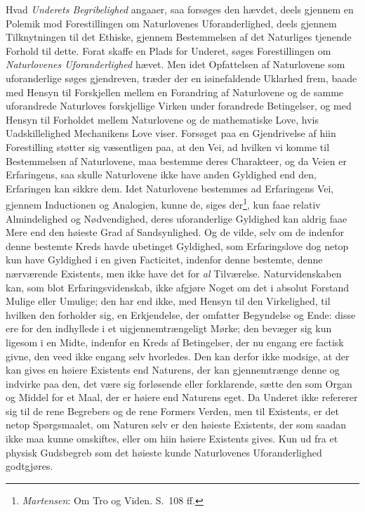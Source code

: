 \documentclass[12pt,a4paper]{book}
\newcommand{\opage}[1]{\marginnote{\footnotesize\textit{[#1]}}}
\begin{document}
Hvad \emph{Underets Begribelighed} angaaer, saa forsøges den hævdet, deels gjennem en Polemik
mod Forestillingen om Naturlovenes Uforanderlighed, deels gjennem Tilknytningen til det
Ethiske, gjennem Bestemmelsen af det Naturliges tjenende Forhold til dette. Forat skaffe
en Plads for Underet, søges Forestillingen om \emph{Naturlovenes Uforanderlighed} hævet. Men
idet Opfattelsen af Naturlovene som uforanderlige søges gjendreven, træder der en
iøinefaldende Uklarhed frem, baade med Hensyn til Forskjellen mellem en Forandring af
Naturlovene og de samme uforandrede Naturloves forskjellige Virken under forandrede
Betingelser, og med Hensyn til Forholdet mellem Naturlovene og de mathematiske Love, hvis
Uadskillelighed Mechanikens Love viser. Forsøget paa en Gjendrivelse af hiin Forestilling
støtter sig væsentligen paa, at den Vei, ad hvilken vi komme til Bestemmelsen af
Naturlovene, maa bestemme deres Charakteer, og da Veien er Erfaringens, saa skulle
Naturlovene ikke have anden Gyldighed end den, Erfaringen kan sikkre dem. Idet
Naturlovene bestemmes ad Erfaringens Vei, gjennem Inductionen og Analogien, kunne de,
siges der\footnote{\emph{Martensen}: Om Tro og Viden. S.\ 108 ff.}, kun faae relativ
Almindelighed og Nødvendighed, deres uforanderlige Gyldighed kan aldrig faae Mere end den
høieste Grad af Sandsynlighed. Og de vilde, selv om de indenfor denne bestemte Kreds
havde ubetinget Gyldighed, som Erfaringslove dog netop kun have Gyldighed i en given
Facticitet, indenfor denne bestemte, denne nærværende Existents, men ikke have det for \emph{al} Tilværelse. \opage{83}Naturvidenskaben kan, som blot Erfaringsvidenskab, ikke afgjøre Noget om det
i absolut Forstand Mulige eller Umulige; den har end ikke, med Hensyn til den
Virkelighed, til hvilken den forholder sig, en Erkjendelse, der omfatter Begyndelse og
Ende: disse ere for den indhyllede i et uigjennemtrængeligt Mørke; den bevæger sig kun
ligesom i en Midte, indenfor en Kreds af Betingelser, der nu engang ere factisk givne,
den veed ikke engang selv hvorledes. Den kan derfor ikke modsige, at der kan gives en
høiere Existents end Naturens, der kan gjennemtrænge denne og indvirke paa den, det være
sig forløsende eller forklarende, sætte den som Organ og Middel for et Maal, der er
høiere end Naturens eget. Da Underet ikke refererer sig til de rene Begrebers og de rene
Formers Verden, men til Existents, er det netop Spørgsmaalet, om Naturen selv er den
høieste Existents, der som saadan ikke maa kunne omskiftes, eller om hiin høiere Existents
gives. Kun ud fra et physisk Gudsbegreb som det høieste kunde Naturlovenes
Uforanderlighed godtgjøres.
\end{document}
